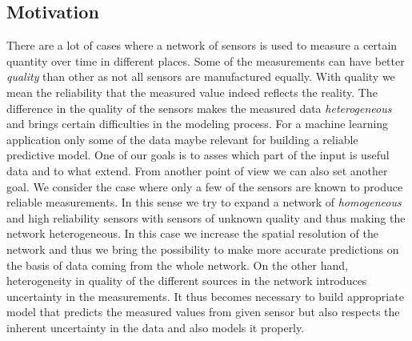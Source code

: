 \documentclass[12pt,a4paper,twoside]{scrartcl}
\numberwithin{equation}{section}
\begin{document}
\subsection{Motivation}\label{sec:motivation}
There are a lot of cases where a network of sensors is used to measure a certain quantity over time in different places. Some of the measurements can have better \emph{quality} than other as not all sensors are manufactured equally. With quality we mean the reliability that the measured value indeed reflects the reality. The difference in the quality of the sensors makes the measured data \emph{heterogeneous} and brings certain difficulties in the modeling process. For a machine learning application only some of the data maybe relevant for building a reliable predictive model. One of our goals is to asses which part of the input is useful data and to what extend. From another point of view we can also set another goal. We consider the case where only a few of the sensors are known to produce reliable measurements. In this sense we try to expand a network of \emph{homogeneous} and high reliability sensors with sensors of unknown quality and thus making the network heterogeneous. In this case we increase the spatial resolution of the network and thus we bring the possibility to make more accurate predictions on the basis of data coming from the whole network. On the other hand, heterogeneity in quality of the different sources in the network introduces uncertainty in the measurements. It thus becomes necessary to build appropriate model that predicts the measured values from given sensor but also respects the inherent uncertainty in the data and also models it properly.
\end{document}
